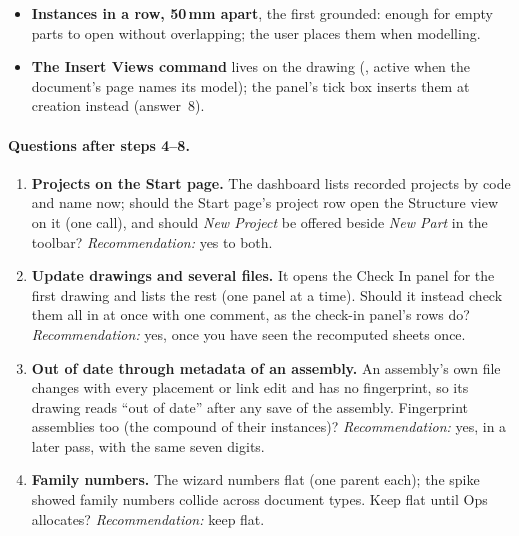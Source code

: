 \begin{itemize}[nosep]
        the Structure view and in the checklist line, so an older vault without BOMs still gets the chain.
  \item \textbf{Instances in a row, 50\,mm apart}, the first grounded: enough for empty parts to open without
        overlapping; the user places them when modelling.
  \item \textbf{The Insert Views command} lives on the drawing (, active when the
        document's page names its model); the panel's tick box inserts them at creation instead (answer~8).
\end{itemize}

\paragraph{Questions after steps 4--8.}
\begin{enumerate}[nosep]
  \item \textbf{Projects on the Start page.} The dashboard lists recorded projects by code and name now; should
        the Start page's project row open the Structure view on it (one call), and should \emph{New Project} be
        offered beside \emph{New Part} in the toolbar? \emph{Recommendation:} yes to both.
  \item \textbf{Update drawings and several files.} It opens the Check In panel for the first drawing and lists
        the rest (one panel at a time). Should it instead check them all in at once with one comment, as the
        check-in panel's rows do? \emph{Recommendation:} yes, once you have seen the recomputed sheets once.
  \item \textbf{Out of date through metadata of an assembly.} An assembly's own file changes with every placement
        or link edit and has no fingerprint, so its drawing reads ``out of date'' after any save of the assembly.
        Fingerprint assemblies too (the compound of their instances)? \emph{Recommendation:} yes, in a later pass,
        with the same seven digits.
  \item \textbf{Family numbers.} The wizard numbers flat (one parent each); the spike showed family numbers collide
        across document types. Keep flat until Ops allocates? \emph{Recommendation:} keep flat.
\end{enumerate}
